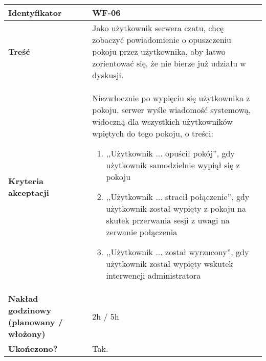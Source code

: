 \begin{tabular}{ | l | l | }
	\hline
		\textbf{Identyfikator} &
		WF-06
		\\

	\hline
		\textbf{Treść} & \parbox[t]{11.5cm}{\strut
			Jako użytkownik serwera czatu, chcę zobaczyć
			powiadomienie o opuszczeniu pokoju przez użytkownika,
			aby łatwo zorientować się, że nie bierze już udziału
			w dyskusji.
		\strut}\\

	\hline
		\parbox[t]{4cm}{\textbf{Kryteria akceptacji}} & \parbox[t]{11.5cm}{\strut
			\begin{enumreq}
				\item Niezwłocznie po wypięciu się użytkownika z
				pokoju, serwer wyśle wiadomość systemową, widoczną
				dla wszystkich użytkowników wpiętych do tego pokoju,
				o treści:
				\begin{enumerate}
					\item ,,Użytkownik ... opuścił pokój'', gdy
					użytkownik samodzielnie wypiął się z pokoju
					\item ,,Użytkownik ... stracił połączenie'',
					gdy użytkownik został wypięty z pokoju na skutek
					przerwania sesji z uwagi na zerwanie połączenia
					\item ,,Użytkownik ... został wyrzucony'', gdy
					użytkownik został wypięty wskutek interwencji
					administratora
				\end{enumerate}
			\end{enumreq}
			\strut}
		\\

	\hline

  \parbox[t]{4cm}{\textbf{Nakład godzinowy (planowany / włożony)}} &
  \parbox[t]{11.5cm}{\strut
    2h / 5h
  \strut}\\

  \hline
    \parbox[t]{4cm}{\textbf{Ukończono?}} &
    \parbox[t]{11.5cm}{\strut
      Tak.
    \strut}\\
\hline
\end{tabular}

\vspace{1em}

